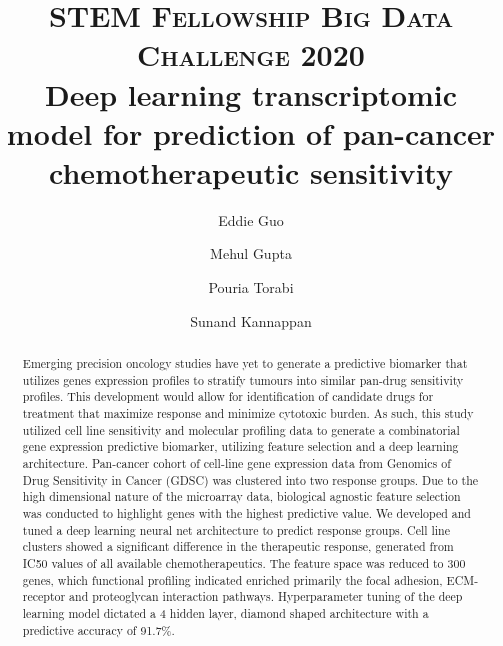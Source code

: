 \documentclass[10pt, letterpaper]{article}
\title{
    \usefont{OT1}{bch}{b}{n}
    \normalfont \normalsize \textsc{STEM Fellowship Big Data Challenge 2020} \\ [10pt]
    \huge Deep learning transcriptomic model for prediction of pan-cancer chemotherapeutic sensitivity \\
}
\author[1]{Eddie Guo}
\author[2]{Mehul Gupta}
\author[1]{Pouria Torabi}
\author[2]{Sunand Kannappan}
\affil[1]{University of Alberta}
\affil[2]{University of Calgary}
\begin{document}
\maketitle


\begin{abstract}
	Emerging precision oncology studies have yet to generate a predictive biomarker that utilizes genes expression profiles to stratify tumours into similar pan-drug sensitivity profiles. This development would allow for identification of candidate drugs for treatment that maximize response and minimize cytotoxic burden. As such, this study utilized cell line sensitivity and molecular profiling data to generate a combinatorial gene expression predictive biomarker, utilizing feature selection and a deep learning architecture. Pan-cancer cohort of cell-line gene expression data from Genomics of Drug Sensitivity in Cancer (GDSC) was clustered into two response groups. Due to the high dimensional nature of the microarray data, biological agnostic feature selection was conducted to highlight genes with the highest predictive value. We developed and tuned a deep learning neural net architecture to predict response groups. Cell line clusters showed a significant difference in the therapeutic response, generated from IC50 values of all available chemotherapeutics. The feature space was reduced to 300 genes, which functional profiling indicated enriched primarily the focal adhesion, ECM-receptor and proteoglycan interaction pathways. Hyperparameter tuning of the deep learning model dictated a 4 hidden layer, diamond shaped architecture with a predictive accuracy of 91.7\%. \vspace{1em}

\end{abstract} \vspace{1em}
\end{document}
